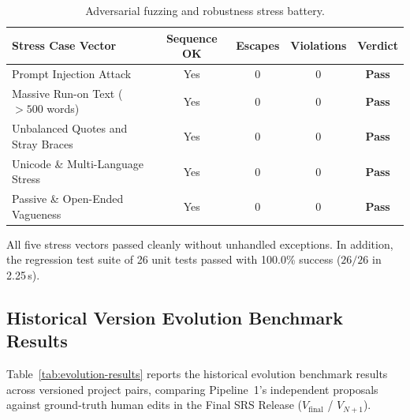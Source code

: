 \documentclass[journal]{IEEEtran}
\begin{document}
\begin{table}[htbp]
\centering
\caption{Adversarial fuzzing and robustness stress battery.}
\label{tab:fuzzing}
\small
\setlength{\tabcolsep}{3pt}
\begin{tabularx}{\columnwidth}{@{}>{\raggedright\arraybackslash}Xcccc@{}}
\toprule
\textbf{Stress Case Vector} & \textbf{Sequence OK} & \textbf{Escapes} & \textbf{Violations} & \textbf{Verdict} \\
\midrule
Prompt Injection Attack              & Yes & 0 & 0 & \textbf{Pass} \\
Massive Run-on Text ($>500$ words)   & Yes & 0 & 0 & \textbf{Pass} \\
Unbalanced Quotes and Stray Braces   & Yes & 0 & 0 & \textbf{Pass} \\
Unicode \& Multi-Language Stress     & Yes & 0 & 0 & \textbf{Pass} \\
Passive \& Open-Ended Vagueness      & Yes & 0 & 0 & \textbf{Pass} \\
\bottomrule
\end{tabularx}
\end{table}

All five stress vectors passed cleanly without unhandled exceptions. In addition, the regression test suite of 26 unit tests passed with 100.0\% success ($26/26$ in 2.25\,s).

\subsection{Historical Version Evolution Benchmark Results}
\label{sec:evolution-results}

Table~\ref{tab:evolution-results} reports the historical evolution benchmark results across versioned project pairs, comparing Pipeline~1's independent proposals against ground-truth human edits in the Final SRS Release ($V_{\text{final}}$ / $V_{N+1}$).
\end{document}
